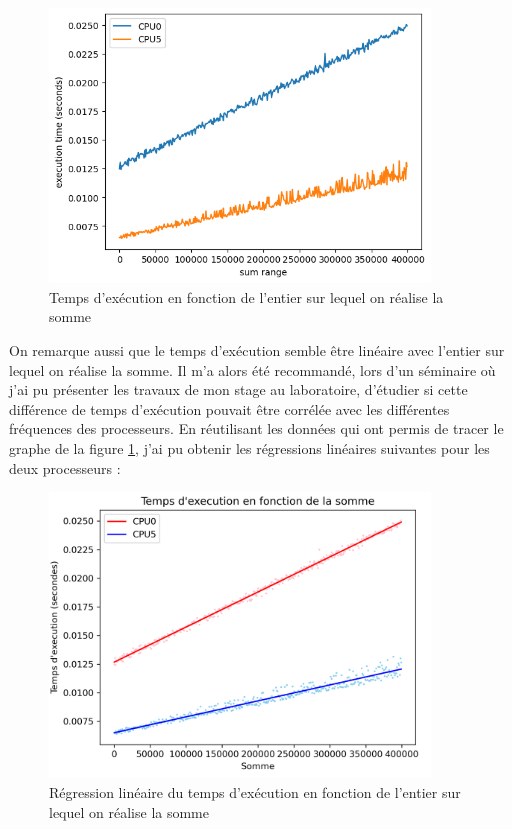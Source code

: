 \begin{figure}[H]
    \centering
    \includegraphics[width=0.9\textwidth]{Images/graphSum0and5.png}
    \caption{Temps d'exécution en fonction de l'entier sur lequel on réalise la somme}
    \label{fig:sum_int}    
\end{figure}


On remarque aussi que le temps d'exécution semble être linéaire avec l'entier sur lequel on réalise la somme. Il m'a alors été recommandé, lors d'un séminaire où j'ai pu présenter les travaux de mon stage au laboratoire, d'étudier si cette différence de temps d'exécution pouvait être corrélée avec les différentes fréquences des processeurs. En réutilisant les données qui ont permis de tracer le graphe de la figure \ref{fig:sum_int}, j'ai pu obtenir les régressions linéaires suivantes pour les deux processeurs :

\begin{figure}[H]
    \centering
    \includegraphics[width=0.9\textwidth]{Images/linear_regression.png}
    \caption{Régression linéaire du temps d'exécution en fonction de l'entier sur lequel on réalise la somme}
\end{figure}


